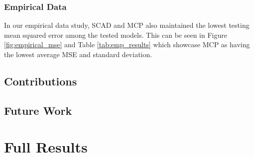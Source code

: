 \documentclass{article}
\begin{document}
\subsubsection{Empirical Data}
In our empirical data study, SCAD and MCP also maintained the lowest testing mean squared error among the tested models. This can be seen in Figure \ref{fig:empirical_mse} and Table \ref{tab:emp_results} which showcase MCP as having the lowest average MSE and standard deviation.

\subsection{Contributions}
\subsection{Future Work}

\newpage
\appendix
\section{Full Results}
\label{app:full-results}

\setlength{\tabcolsep}{3pt}

{\tiny
\begin{landscape}
	\centering
	\captionsetup{width = 6in}
	\label{tab:train-mse-1000-10}
	
	
	\newpage
	
	\label{tab:test-mse-1000-10}
	
	
	\newpage
	
	\label{tab:train-mse-50-2000}
	
	
	\bigskip
	
	\label{tab:test-mse-50-2000}
	
\end{landscape}
}
\setlength{\tabcolsep}{6pt}



\newpage


\end{document}
